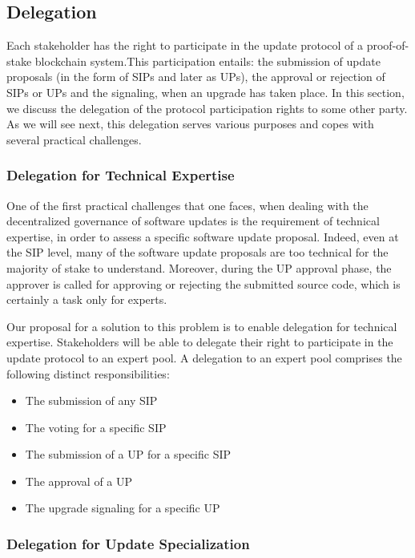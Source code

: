 \subsection{Delegation}
Each stakeholder has the right to participate in the update protocol of a proof-of-stake blockchain system.This participation entails: the submission of update proposals (in the form of SIPs and later as UPs), the approval or rejection of SIPs or UPs and the signaling, when an upgrade has taken place. In this section, we discuss the delegation of the protocol participation rights to some other party. As we will see next, this delegation serves various purposes and copes with several practical challenges.
\subsubsection{Delegation for Technical Expertise}
One of the first practical challenges that one faces, when dealing with the decentralized governance of software updates is the requirement of technical expertise, in order to assess a specific software update proposal. Indeed, even at the SIP level, many of the software update proposals are too technical for the majority of stake to understand. Moreover, during the UP approval phase, the approver is called for approving or rejecting the submitted source code, which is certainly a task only for experts.

Our proposal for a solution to this problem is to enable delegation for technical expertise. Stakeholders will be able to delegate their right to participate in the update protocol to an expert pool. A delegation to an expert pool comprises the following distinct responsibilities:
\begin{itemize}
\item The submission of any SIP
\item The voting for a specific SIP
\item The submission of a UP for a specific SIP
\item The approval of a UP
\item The upgrade signaling for a specific UP
\end{itemize}

\subsubsection{Delegation for Update Specialization}
  
